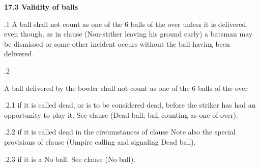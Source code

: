 \documentclass[12pt]{article}
\begin{document}
\vspace{\baselineskip}
{\fontsize{11pt}{13.2pt}\selectfont \textbf{17.3 \tabto{0.47in} Validity of balls}\par}\par


\vspace{\baselineskip}
\begin{adjustwidth}{0.5in}{0.07in}
{\fontsize{9pt}{10.8pt}.1 \tabto{0.49in} A ball shall not count as one of the 6 balls of the over unless it is delivered, even though, as in clause  (Non-striker leaving his ground early) a batsman may be dismissed or some other incident occurs without the ball having been delivered.\par}\par

\end{adjustwidth}


\vspace{\baselineskip}
{\fontsize{9pt}{10.8pt}.2 \tabto{0.49in} {\fontsize{8pt}{9.6pt}\selectfont A ball delivered by the bowler shall not count as one of the 6 balls of the over\par}\par}\par


\vspace{\baselineskip}
\begin{adjustwidth}{1.18in}{0.07in}
{\fontsize{9pt}{10.8pt}.2.1 \tabto{1.17in} if it is called dead, or is to be considered dead, before the striker has had an opportunity to play it. See clause (Dead ball; ball counting as one of over).\par}\par

\end{adjustwidth}


\vspace{\baselineskip}
\begin{adjustwidth}{1.18in}{0.19in}
{\fontsize{9pt}{10.8pt}.2.2 \tabto{1.17in} if it is called dead in the circumstances of clause Note also the special provisions of clause (Umpire calling and signaling Dead ball).\par}\par

\end{adjustwidth}


\vspace{\baselineskip}
\begin{adjustwidth}{0.49in}{0.0in}
{\fontsize{9pt}{10.8pt}.2.3 \tabto{1.17in} if it is a No ball. See clause (No ball).\par}\par

\end{adjustwidth}
\end{document}
